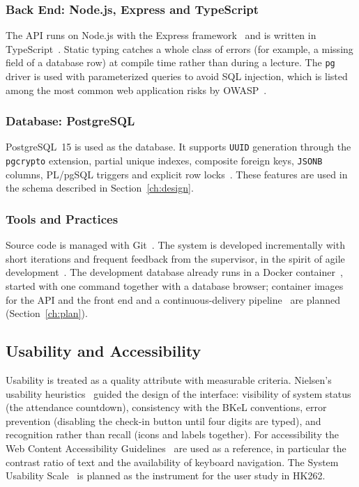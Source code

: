\subsubsection{Back End: Node.js, Express and TypeScript}

The API runs on Node.js with the Express framework~\cite{nodedocs, expressdocs} and is written in TypeScript~\cite{typescriptdocs}. Static typing catches a whole class of errors (for example, a missing field of a database row) at compile time rather than during a lecture. The \texttt{pg} driver is used with parameterized queries to avoid SQL injection, which is listed among the most common web application risks by OWASP~\cite{owasptop10}.

\subsubsection{Database: PostgreSQL}

PostgreSQL~15 is used as the database. It supports \texttt{UUID} generation through the \texttt{pgcrypto} extension, partial unique indexes, composite foreign keys, \texttt{JSONB} columns, PL/pgSQL triggers and explicit row locks~\cite{postgresdocs}. These features are used in the schema described in Section~\ref{ch:design}.

\subsubsection{Tools and Practices}

Source code is managed with Git~\cite{chacon2014progit}. The system is developed incrementally with short iterations and frequent feedback from the supervisor, in the spirit of agile development~\cite{beck2001agile, sommerville2016software}. The development database already runs in a Docker container~\cite{merkel2014docker}, started with one command together with a database browser; container images for the API and the front end and a continuous-delivery pipeline~\cite{humble2010continuous} are planned (Section~\ref{ch:plan}).

\subsection{Usability and Accessibility}

Usability is treated as a quality attribute with measurable criteria. Nielsen's usability heuristics~\cite{nielsen1993usability} guided the design of the interface: visibility of system status (the attendance countdown), consistency with the BKeL conventions, error prevention (disabling the check-in button until four digits are typed), and recognition rather than recall (icons and labels together). For accessibility the Web Content Accessibility Guidelines~\cite{wcag21} are used as a reference, in particular the contrast ratio of text and the availability of keyboard navigation. The System Usability Scale~\cite{brooke1996sus, bangor2008empirical} is planned as the instrument for the user study in HK262.
